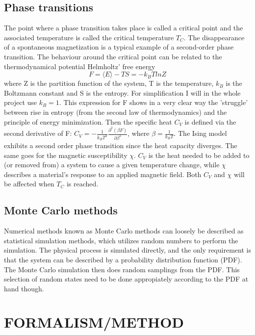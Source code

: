 \documentclass[twocolumn]{article}
\begin{document}
\subsection{Phase transitions}
The point where a phase transition takes place is called a critical point and the associated temperature is called the critical temperature $T_C$. The disappearance of a spontaneous magnetization is a typical example of a second-order phase transition. The behaviour around the critical point can be related to the thermodynamical potential Helmholtz' free energy
\begin{equation}
    F = \langle E \rangle - TS = - k_B TlnZ
\end{equation}
where Z is the partition function of the system, T is the temperature, $k_B$ is the Boltzmann constant and S is the entropy. For simplification I will in the whole project use $k_B = 1$. This expression for F shows in a very clear way the 'struggle' between rise in entropy (from the second law of thermodynamics) and the principle of energy minimization.\newline
Then the specific heat $C_V$ is defined via the second derivative of F: $C_V = - \frac{1}{k_B T^2}\frac{\partial^2(\beta F)}{\partial \beta ^2}$, where $\beta = \frac{1}{k_B T}$. The Ising model exhibits a second order phase transition since the heat capacity diverges. The same goes for the magnetic susceptibility $\chi$.\newline
$C_V$ is the heat needed to be added to (or removed from) a system to cause a given temperature change, while $\chi$ describes a material's response to an applied magnetic field. Both $C_V$ and $\chi$ will be affected when $T_C$ is reached.

\subsection{Monte Carlo methods}
Numerical methods known as Monte Carlo methods can loosely be described as statistical simulation methods, which utilizes random numbers to perform the simulation. The physical process is simulated directly, and the only requirement is that the system can be described by a probability distribution function (PDF). The Monte Carlo simulation then does random samplings from the PDF. This selection of random states need to be done appropiately according to the PDF at hand though.

\section{FORMALISM/METHOD}
\end{document}
